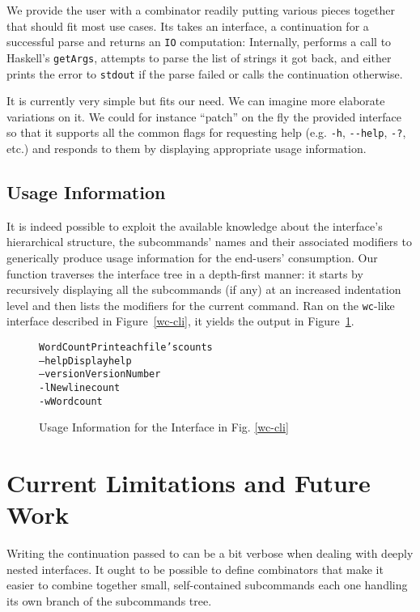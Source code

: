 \documentclass[preprint,9pt]{sigplanconf}
\begin{document}
We provide the user with a combinator readily putting various
pieces together that should fit most use cases. Its takes an interface,
a continuation for a successful parse and returns an \texttt{IO}
computation:
Internally,  performs a call to Haskell's \texttt{getArgs},
attempts to parse the list of strings it got back, and either prints
the error to \texttt{stdout} if the parse failed or calls the
continuation otherwise.

It is currently very simple but fits our need. We can imagine
more elaborate variations on it. We could for instance ``patch''
on the fly the provided interface so that it supports all the
common flags for requesting help (e.g. \texttt{-h}, \texttt{-{}-help},
\texttt{-?}, etc.) and responds to them by displaying appropriate
usage information.

\subsection{Usage Information}

It is indeed possible to exploit the available knowledge about
the interface's hierarchical structure, the subcommands' names
and their associated modifiers to generically produce usage
information for the end-users' consumption. Our 
function traverses the interface tree in a depth-first manner:
it starts by recursively displaying all the subcommands (if any)
at an increased indentation level and then lists the modifiers
for the current command. Ran on the \texttt{wc}-like interface
described in Figure~\ref{wc-cli}, it yields the output in
Figure~\ref{wc-usage}.

\begin{figure}[ht]
\begin{alltt}
WordCount  Print each file's counts
  --help     Display help
  --version  Version Number
  -l         Newline count
  -w         Word count
\end{alltt}
\caption{Usage Information for the Interface in Fig. \ref{wc-cli}}
\label{wc-usage}
\end{figure}

\section{Current Limitations and Future Work}

Writing the continuation passed to  can be a bit
verbose when dealing with deeply nested interfaces. It ought
to be possible to define combinators that make it easier to
combine together small, self-contained subcommands each one
handling its own branch of the subcommands tree.
\end{document}
